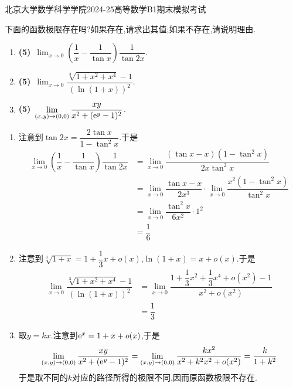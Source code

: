 \documentclass{ctexart}
\begin{document}
\pagestyle{empty}
\begin{center}\Large
北京大学数学科学学院2024-25高等数学B1期末模拟考试
\end{center}
\begin{problem}[1.(15\songti{分})]
下面的函数极限存在吗?如果存在,请求出其值;如果不存在,请说明理由.
        \begin{enumerate}[label=\tbf{(\arabic*)}]
            \item \textbf{(5)}\ $\displaystyle\lim_{x\to0}\left(\dfrac{1}{x}-\dfrac{1}{\tan x}\right)\dfrac{1}{\tan2x}$.
            \item \textbf{(5)}\ $\displaystyle\lim_{x\to0}\dfrac{\sqrt[3]{1+x^2+x^4}-1}{\left(\ln(1+x)\right)^2}$.
            \item \textbf{(5)}\ $\displaystyle\lim_{(x,y)\to(0,0)}\dfrac{xy}{x^2+(\mathrm{e}^y-1)^2}$.
        \end{enumerate}
\end{problem}
\begin{solution}
\begin{enumerate}[label=\tbf{(\arabic*)}]
        \item 注意到$\tan 2x=\dfrac{2\tan x}{1-\tan^2x}$.于是
            \[\begin{aligned}
                \lim_{x\to0}\left(\dfrac{1}{x}-\dfrac{1}{\tan x}\right)\dfrac{1}{\tan2x}
                &= \lim_{x\to0}\dfrac{(\tan x-x)(1-\tan^2x)}{2x\tan^2 x} \\
                &= \lim_{x\to0}\dfrac{\tan x-x}{2x^3}\cdot\lim_{x\to0}\dfrac{x^2(1-\tan^2x)}{\tan^2x} \\
                &= \lim_{x\to0}\dfrac{\tan^2x}{6x^2}\cdot1^2\\
                &= \dfrac16
            \end{aligned}\]
        \item 注意到$\sqrt[3]{1+x}=1+\dfrac13x+o(x)$,$\ln(1+x)=x+o(x)$.于是
            \[\begin{aligned}
                \lim_{x\to0}\dfrac{\sqrt[3]{1+x^2+x^4}-1}{\left(\ln(1+x)\right)^2}
                &= \lim_{x\to0}\dfrac{1+\dfrac13x^2+\dfrac13x^4+o(x^2)-1}{x^2+o(x^2)} \\
                &= \dfrac13
            \end{aligned}\]
        \item 取$y=kx$.注意到$\mathrm{e}^x=1+x+o(x)$,于是
            \[\lim_{(x,y)\to(0,0)}\dfrac{xy}{x^2+(\mathrm{e}^y-1)^2}=\lim_{(x,y)\to(0,0)}\dfrac{kx^2}{x^2+k^2x^2+o(x^2)}=\dfrac{k}{1+k^2}\]
            于是取不同的$k$对应的路径所得的极限不同,因而原函数极限不存在.
    \end{enumerate}
\end{solution}
\end{document}
